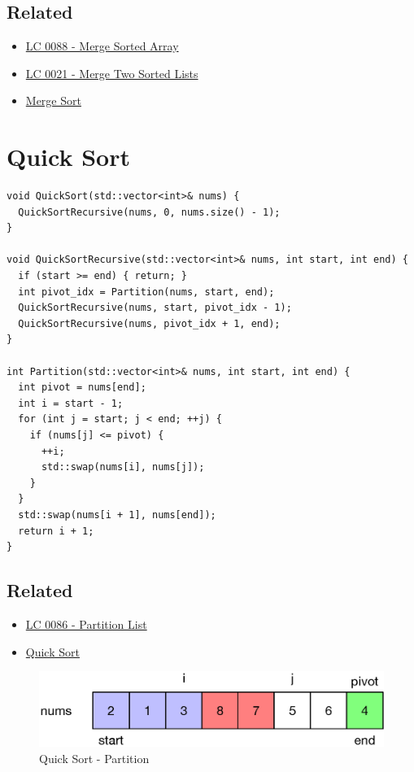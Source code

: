 \subsection*{Related}
\begin{itemize}
	\item \hyperref[lc0088]{LC 0088 - Merge Sorted Array}
	\item \hyperref[lc0021]{LC 0021 - Merge Two Sorted Lists}
	\item \hyperref[merge_sort]{Merge Sort}
\end{itemize}

\section{Quick Sort}\label{quick_sort}
\begin{lstlisting}
void QuickSort(std::vector<int>& nums) {
  QuickSortRecursive(nums, 0, nums.size() - 1);
}

void QuickSortRecursive(std::vector<int>& nums, int start, int end) {
  if (start >= end) { return; }
  int pivot_idx = Partition(nums, start, end);
  QuickSortRecursive(nums, start, pivot_idx - 1);
  QuickSortRecursive(nums, pivot_idx + 1, end);
}

int Partition(std::vector<int>& nums, int start, int end) {
  int pivot = nums[end];
  int i = start - 1;
  for (int j = start; j < end; ++j) {
    if (nums[j] <= pivot) {
      ++i;
      std::swap(nums[i], nums[j]);
    }
  }
  std::swap(nums[i + 1], nums[end]);
  return i + 1;
}
\end{lstlisting}

\subsection*{Related}
\begin{itemize}
	\item \hyperref[lc0086]{LC 0086 - Partition List}
	\item \hyperref[quick_sort]{Quick Sort}
\end{itemize}

\begin{figure}[H]
	\centering
	\includegraphics[width=0.5\linewidth]{images/quick_sort}
	\caption{Quick Sort - Partition}
	\label{fig:quicksort}
\end{figure}

